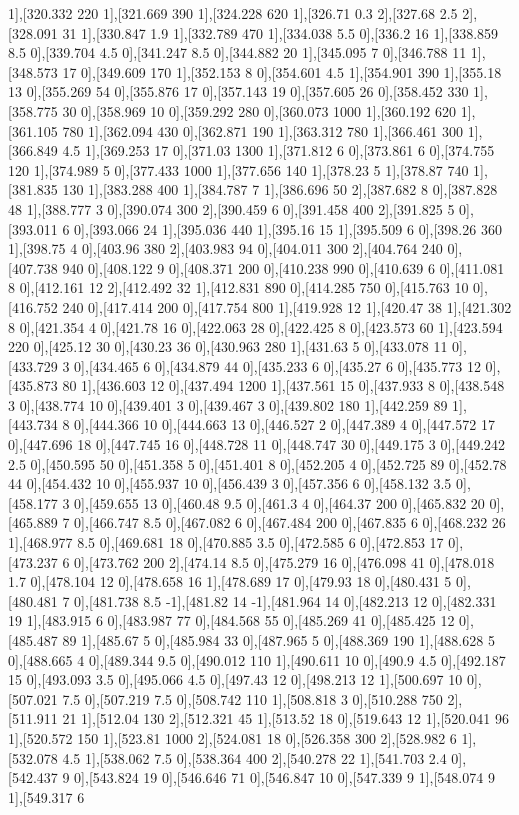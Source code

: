 {1],[320.332 220 1],[321.669 390 1],[324.228 620 1],[326.71 0.3 2],[327.68 2.5 2],[328.091 31 1],[330.847 1.9 1],[332.789 470 1],[334.038 5.5 0],[336.2 16 1],[338.859 8.5 0],[339.704 4.5 0],[341.247 8.5 0],[344.882 20 1],[345.095 7 0],[346.788 11 1],[348.573 17 0],[349.609 170 1],[352.153 8 0],[354.601 4.5 1],[354.901 390 1],[355.18 13 0],[355.269 54 0],[355.876 17 0],[357.143 19 0],[357.605 26 0],[358.452 330 1],[358.775 30 0],[358.969 10 0],[359.292 280 0],[360.073 1000 1],[360.192 620 1],[361.105 780 1],[362.094 430 0],[362.871 190 1],[363.312 780 1],[366.461 300 1],[366.849 4.5 1],[369.253 17 0],[371.03 1300 1],[371.812 6 0],[373.861 6 0],[374.755 120 1],[374.989 5 0],[377.433 1000 1],[377.656 140 1],[378.23 5 1],[378.87 740 1],[381.835 130 1],[383.288 400 1],[384.787 7 1],[386.696 50 2],[387.682 8 0],[387.828 48 1],[388.777 3 0],[390.074 300 2],[390.459 6 0],[391.458 400 2],[391.825 5 0],[393.011 6 0],[393.066 24 1],[395.036 440 1],[395.16 15 1],[395.509 6 0],[398.26 360 1],[398.75 4 0],[403.96 380 2],[403.983 94 0],[404.011 300 2],[404.764 240 0],[407.738 940 0],[408.122 9 0],[408.371 200 0],[410.238 990 0],[410.639 6 0],[411.081 8 0],[412.161 12 2],[412.492 32 1],[412.831 890 0],[414.285 750 0],[415.763 10 0],[416.752 240 0],[417.414 200 0],[417.754 800 1],[419.928 12 1],[420.47 38 1],[421.302 8 0],[421.354 4 0],[421.78 16 0],[422.063 28 0],[422.425 8 0],[423.573 60 1],[423.594 220 0],[425.12 30 0],[430.23 36 0],[430.963 280 1],[431.63 5 0],[433.078 11 0],[433.729 3 0],[434.465 6 0],[434.879 44 0],[435.233 6 0],[435.27 6 0],[435.773 12 0],[435.873 80 1],[436.603 12 0],[437.494 1200 1],[437.561 15 0],[437.933 8 0],[438.548 3 0],[438.774 10 0],[439.401 3 0],[439.467 3 0],[439.802 180 1],[442.259 89 1],[443.734 8 0],[444.366 10 0],[444.663 13 0],[446.527 2 0],[447.389 4 0],[447.572 17 0],[447.696 18 0],[447.745 16 0],[448.728 11 0],[448.747 30 0],[449.175 3 0],[449.242 2.5 0],[450.595 50 0],[451.358 5 0],[451.401 8 0],[452.205 4 0],[452.725 89 0],[452.78 44 0],[454.432 10 0],[455.937 10 0],[456.439 3 0],[457.356 6 0],[458.132 3.5 0],[458.177 3 0],[459.655 13 0],[460.48 9.5 0],[461.3 4 0],[464.37 200 0],[465.832 20 0],[465.889 7 0],[466.747 8.5 0],[467.082 6 0],[467.484 200 0],[467.835 6 0],[468.232 26 1],[468.977 8.5 0],[469.681 18 0],[470.885 3.5 0],[472.585 6 0],[472.853 17 0],[473.237 6 0],[473.762 200 2],[474.14 8.5 0],[475.279 16 0],[476.098 41 0],[478.018 1.7 0],[478.104 12 0],[478.658 16 1],[478.689 17 0],[479.93 18 0],[480.431 5 0],[480.481 7 0],[481.738 8.5 -1],[481.82 14 -1],[481.964 14 0],[482.213 12 0],[482.331 19 1],[483.915 6 0],[483.987 77 0],[484.568 55 0],[485.269 41 0],[485.425 12 0],[485.487 89 1],[485.67 5 0],[485.984 33 0],[487.965 5 0],[488.369 190 1],[488.628 5 0],[488.665 4 0],[489.344 9.5 0],[490.012 110 1],[490.611 10 0],[490.9 4.5 0],[492.187 15 0],[493.093 3.5 0],[495.066 4.5 0],[497.43 12 0],[498.213 12 1],[500.697 10 0],[507.021 7.5 0],[507.219 7.5 0],[508.742 110 1],[508.818 3 0],[510.288 750 2],[511.911 21 1],[512.04 130 2],[512.321 45 1],[513.52 18 0],[519.643 12 1],[520.041 96 1],[520.572 150 1],[523.81 1000 2],[524.081 18 0],[526.358 300 2],[528.982 6 1],[532.078 4.5 1],[538.062 7.5 0],[538.364 400 2],[540.278 22 1],[541.703 2.4 0],[542.437 9 0],[543.824 19 0],[546.646 71 0],[546.847 10 0],[547.339 9 1],[548.074 9 1],[549.317 6 }
